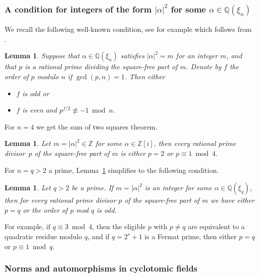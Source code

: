 \documentclass{article}
\newtheorem{lemma}[theorem]{Lemma}
\theoremstyle{definition}
\begin{document}
\subsubsection*{A condition for integers of the form $|\alpha|^2$ for some $\alpha\in \mathbb{Q}(\xi_n)$}%


We recall the following well-known condition, see for example \cite[Theorem~3.1]{b88} which follows from \cite[Lemma~3]{t65}.
\begin{lemma}
\label{brock}
Suppose that $\alpha\in \mathbb{Q}(\xi_n)$ satisfies $|\alpha|^2=m$ for an integer $m$, and that $p$ is a rational prime dividing the square-free part of $m$. Denote by $f$ the order of $p$ modulo $n$ if $\gcd(p,n)=1$. Then either   
\begin{itemize}
\item $f$ is odd or
\item $f$ is even and $p^{f/2}\not\equiv -1\bmod n$.
\end{itemize}
\end{lemma}

\noindent
For $n=4$ we get the sum of two squares theorem.
\begin{lemma}\label{twosquare}
Let $m=|\alpha|^2\in\mathbb{Z}$ for some $\alpha\in \mathbb{Z}[i]$, then every rational prime  divisor~$p$ of the square-free part of $m$ is either $p=2$ or $p\equiv 1\bmod 4$.
\end{lemma}

\noindent
For $n=q>2$ a prime, Lemma~\ref{brock} simplifies to the following condition.
\begin{lemma}\label{brockp} 
Let $q>2$ be a prime.
If $m=|\alpha|^2$ is an integer for some $\alpha\in \mathbb{Q}(\xi_q)$, then for every rational prime divisor $p$ of the square-free part of $m$ we have either $p=q$ or the order of $p$ mod $q$ is odd.
\end{lemma}
For example, if $q\equiv 3\bmod 4$, then the eligible $p$ with $p\not=q$ are equivalent to a quadratic residue modulo $q$, and if $q=2^s+1$ is a Fermat prime, then either $p=q$ or $p\equiv 1\bmod q$.

\subsubsection*{Norms and automorphisms in cyclotomic fields}
\end{document}
